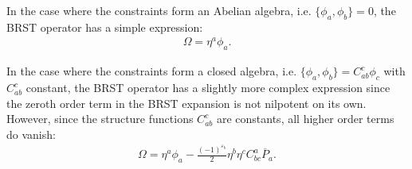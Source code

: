     \begin{example}
        In the case where the constraints form an Abelian algebra, i.e. $\{\phi_a,\phi_b\}=0$, the BRST operator has a simple expression:
        \begin{gather}
            \Omega = \eta^a\phi_a.
        \end{gather}
    \end{example}
    \begin{example}
        In the case where the constraints form a closed algebra, i.e. $\{\phi_a,\phi_b\}=C^c_{ab}\phi_c$ with $C^c_{ab}$ constant, the BRST operator has a slightly more complex expression since the zeroth order term in the BRST expansion is not nilpotent on its own. However, since the structure functions $C^c_{ab}$ are constants, all higher order terms do vanish:
        \begin{gather}
            \Omega = \eta^a\phi_a -\frac{(-1)^{\varepsilon_b}}{2}\eta^b\eta^c C^a_{bc}\overline{P}_a.
        \end{gather}
    \end{example}

